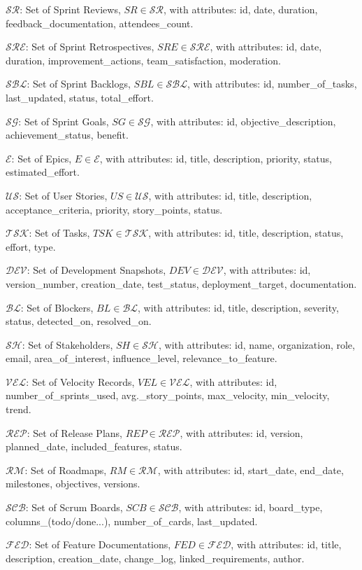 \documentclass[12pt]{article}
\begin{document}
    \item $ \mathcal{SR} $: Set of Sprint Reviews, $ SR \in \mathcal{SR} $, with attributes: id, date, duration, feedback\_documentation, attendees\_count.
    \item $ \mathcal{SRE} $: Set of Sprint Retrospectives, $ SRE \in \mathcal{SRE} $, with attributes: id, date, duration, improvement\_actions, team\_satisfaction, moderation.
    \item $ \mathcal{SBL} $: Set of Sprint Backlogs, $ SBL \in \mathcal{SBL} $, with attributes: id, number\_of\_tasks, last\_updated, status, total\_effort.
    \item $ \mathcal{SG} $: Set of Sprint Goals, $ SG \in \mathcal{SG} $, with attributes: id, objective\_description, achievement\_status, benefit.
    \item $ \mathcal{E} $: Set of Epics, $ E \in \mathcal{E} $, with attributes: id, title, description, priority, status, estimated\_effort.
    \item $ \mathcal{US} $: Set of User Stories, $ US \in \mathcal{US} $, with attributes: id, title, description, acceptance\_criteria, priority, story\_points, status.
    \item $ \mathcal{TSK} $: Set of Tasks, $ TSK \in \mathcal{TSK} $, with attributes: id, title, description, status, effort, type.
    \item $ \mathcal{DEV} $: Set of Development Snapshots, $ DEV \in \mathcal{DEV} $, with attributes: id, version\_number, creation\_date, test\_status, deployment\_target, documentation.
    \item $ \mathcal{BL} $: Set of Blockers, $ BL \in \mathcal{BL} $, with attributes: id, title, description, severity, status, detected\_on, resolved\_on.
    \item $ \mathcal{SH} $: Set of Stakeholders, $ SH \in \mathcal{SH} $, with attributes: id, name, organization, role, email, area\_of\_interest, influence\_level, relevance\_to\_feature.
    \item $ \mathcal{VEL} $: Set of Velocity Records, $ VEL \in \mathcal{VEL} $, with attributes: id, number\_of\_sprints\_used, avg.\_story\_points, max\_velocity, min\_velocity, trend.
    \item $ \mathcal{REP} $: Set of Release Plans, $ REP \in \mathcal{REP} $, with attributes: id, version, planned\_date, included\_features, status.
    \item $ \mathcal{RM} $: Set of Roadmaps, $ RM \in \mathcal{RM} $, with attributes: id, start\_date, end\_date, milestones, objectives, versions.
    \item $ \mathcal{SCB} $: Set of Scrum Boards, $ SCB \in \mathcal{SCB} $, with attributes: id, board\_type, columns\_(todo/done...), number\_of\_cards, last\_updated.
    \item $ \mathcal{FED} $: Set of Feature Documentations, $ FED \in \mathcal{FED} $, with attributes: id, title, description, creation\_date, change\_log, linked\_requirements, author.
\end{document}
